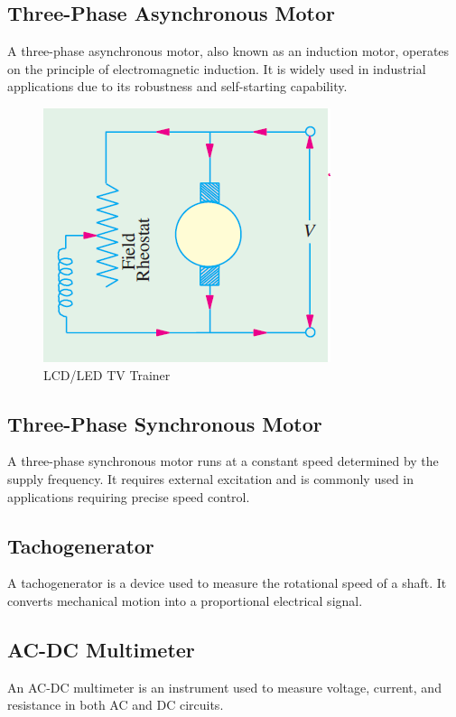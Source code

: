 \documentclass[a4paper,12pt]{article}
\begin{document}
	\subsection{Three-Phase Asynchronous Motor}
	A three-phase asynchronous motor, also known as an induction motor, operates on the principle of electromagnetic induction. It is widely used in industrial applications due to its robustness and self-starting capability.
		\begin{figure}[H]
		\centering
		\includegraphics[width=0.7\linewidth]{"Images/1"}
		\caption{LCD/LED TV Trainer}
		
	\end{figure}
	\subsection{Three-Phase Synchronous Motor}
	A three-phase synchronous motor runs at a constant speed determined by the supply frequency. It requires external excitation and is commonly used in applications requiring precise speed control.
	
	\subsection{Tachogenerator}
	A tachogenerator is a device used to measure the rotational speed of a shaft. It converts mechanical motion into a proportional electrical signal.
	
	\subsection{AC-DC Multimeter}
	An AC-DC multimeter is an instrument used to measure voltage, current, and resistance in both AC and DC circuits.
	
\end{document}
